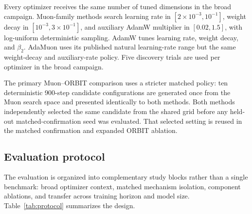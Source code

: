 Every optimizer receives the same number of tuned dimensions in the broad campaign.
Muon-family methods search learning rate in $[2\times10^{-3},10^{-1}]$, weight decay in
$[10^{-3},3\times10^{-1}]$, and auxiliary AdamW multiplier in $[0.02,1.5]$, with
log-uniform deterministic sampling. AdamW tunes learning rate, weight decay, and $\beta_2$.
AdaMuon uses its published natural learning-rate range but the same weight-decay and
auxiliary-rate policy. Five discovery trials are used per optimizer in the broad campaign.

The primary Muon--ORBIT comparison uses a stricter matched policy: ten deterministic
900-step candidate configurations are generated once from the Muon search space and
presented identically to both methods. Both methods independently selected the same candidate from the shared grid before any
held-out matched-confirmation seed was evaluated. That selected setting is reused in
the matched confirmation and expanded ORBIT ablation.

\subsection{Evaluation protocol}
The evaluation is organized into complementary study blocks rather than a single benchmark:
broad optimizer context, matched mechanism isolation, component ablations, and transfer
across training horizon and model size. Table~\ref{tab:protocol} summarizes the design.

